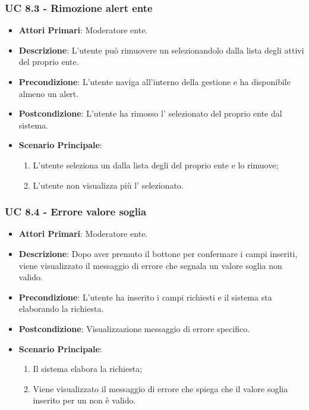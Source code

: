 			\subsubsection{UC 8.3 - Rimozione alert ente}
			\begin{itemize}
				\item \textbf{Attori Primari}: Moderatore ente.
				\item \textbf{Descrizione}: L'utente può rimuovere un  selezionandolo dalla lista degli  attivi del proprio ente.
				\item \textbf{Precondizione}: L'utente naviga all'interno della gestione  e ha disponibile almeno un alert.
				\item \textbf{Postcondizione}: L'utente ha rimosso l' selezionato del proprio ente dal sistema.
				\item \textbf{Scenario Principale}:
				\begin{enumerate}
					\item{L'utente seleziona un  dalla lista degli  del proprio ente e lo rimuove;}
					\item{L'utente non visualizza più l' selezionato.}
				\end{enumerate}	
			\end{itemize}

			\subsubsection{UC 8.4 - Errore valore soglia}
			\begin{itemize}
				\item \textbf{Attori Primari}: Moderatore ente.
				\item \textbf{Descrizione}: Dopo aver premuto il bottone per confermare i campi inseriti, viene visualizzato il messaggio di errore che segnala un valore soglia non valido.
				\item \textbf{Precondizione}: L'utente ha inserito i campi richiesti e il sistema sta elaborando la richiesta.
				\item \textbf{Postcondizione}: Visualizzazione messaggio di errore specifico.
				\item \textbf{Scenario Principale}:
				\begin{enumerate}
					\item{Il sistema elabora la richiesta;}
					\item{Viene visualizzato il messaggio di errore che spiega che il valore soglia inserito per un  non è valido. }
				\end{enumerate}
			\end{itemize}
			
